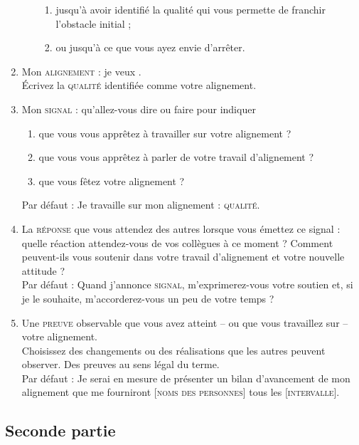 \documentclass[paper=6in:9in,pagesize=pdftex,headinclude=on,footinclude=on,12pt]{scrbook}
\begin{document}
\begin{enumerate}
\begin{enumerate}
\begin{enumerate}
	      	      	\item jusqu'à avoir identifié la qualité qui vous permette de franchir l'obstacle initial ;
	      	      	\item ou jusqu'à ce que vous ayez envie d'arrêter.
	      	      \end{enumerate}
	      \end{enumerate}
	\item Mon \textsc{alignement} : je veux \dotfill.\\
	      Écrivez la \textsc{qualité} identifiée comme votre alignement.
	\item Mon \textsc{signal} : qu'allez-vous dire ou faire pour indiquer
	      \begin{enumerate}
	      	\item que vous vous apprêtez à travailler sur votre alignement ?
	      	\item que vous vous apprêtez à parler de votre travail d'alignement ?
	      	\item que vous fêtez votre alignement ?
	      \end{enumerate}
	      Par défaut : \og{}Je travaille sur mon alignement : \textsc{qualité}\fg{}.
	\item La \textsc{réponse} que vous attendez des autres lorsque vous émettez ce signal : quelle réaction attendez-vous de vos collègues à ce moment ?
	      Comment peuvent-ils vous soutenir dans votre travail d'alignement et votre nouvelle attitude ?\\
	      Par défaut : \og{}Quand j'annonce \textsc{signal}, m'exprimerez-vous votre soutien et, si je le souhaite, m'accorderez-vous un peu de votre
	      temps ?
	\item Une \textsc{preuve} observable que vous avez atteint -- ou que vous travaillez sur -- votre alignement.\\
          Choisissez des changements ou des réalisations que les autres peuvent observer. Des preuves au sens légal du terme. \\
          Par défaut : \og{}Je serai en mesure de présenter un bilan d'avancement de mon alignement que me fourniront [\textsc{noms des personnes}]
          tous les [\textsc{intervalle}].
\end{enumerate}

\subsection{Seconde partie}
\end{document}
